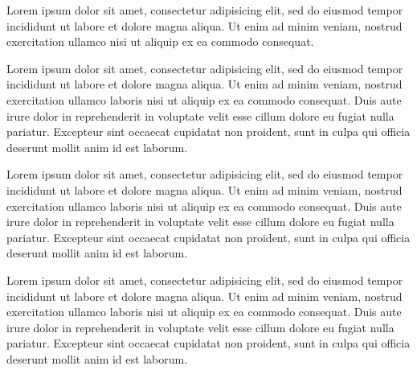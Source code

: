 \documentclass{book}
\begin{document}
\begin{pages}
\begin{Leftside}
\begin{ledgroup}
Lorem ipsum dolor sit amet, consectetur adipisicing elit, sed do eiusmod tempor incididunt ut labore et dolore magna aliqua. Ut enim ad minim veniam, nostrud exercitation ullamco  nisi ut aliquip ex ea commodo consequat. 
\end{ledgroup}
\pend

\endnumbering
\end{Leftside}

\begin{Rightside}
\beginnumbering

\pstart
\begin{ledgroup}

Lorem ipsum dolor sit amet, consectetur adipisicing elit, sed do eiusmod tempor incididunt ut labore et dolore magna aliqua. Ut enim ad minim veniam, nostrud exercitation ullamco laboris nisi ut aliquip ex ea commodo consequat. Duis aute irure dolor in reprehenderit in voluptate velit esse cillum dolore eu fugiat nulla pariatur. Excepteur sint occaecat cupidatat non proident, sunt in culpa qui officia deserunt mollit anim id est laborum.
\end{ledgroup}
\pend

\pstart
\begin{ledgroup}

Lorem ipsum dolor sit amet, consectetur adipisicing elit, sed do eiusmod tempor incididunt ut labore et dolore magna aliqua. Ut enim ad minim veniam, nostrud exercitation ullamco laboris nisi ut aliquip ex ea commodo consequat. Duis aute irure dolor in reprehenderit in voluptate velit esse cillum dolore eu fugiat nulla pariatur. Excepteur sint occaecat cupidatat non proident, sunt in culpa qui officia deserunt mollit anim id est laborum.
\end{ledgroup}
\pend

\pstart
\begin{ledgroup}

Lorem ipsum dolor sit amet, consectetur adipisicing elit, sed do eiusmod tempor incididunt ut labore et dolore magna aliqua. Ut enim ad minim veniam, nostrud exercitation ullamco laboris nisi ut aliquip ex ea commodo consequat. Duis aute irure dolor in reprehenderit in voluptate velit esse cillum dolore eu fugiat nulla pariatur. Excepteur sint occaecat cupidatat non proident, sunt in culpa qui officia deserunt mollit anim id est laborum.
\end{ledgroup}
\pend


\end{Rightside}
\end{pages}
\end{document}
